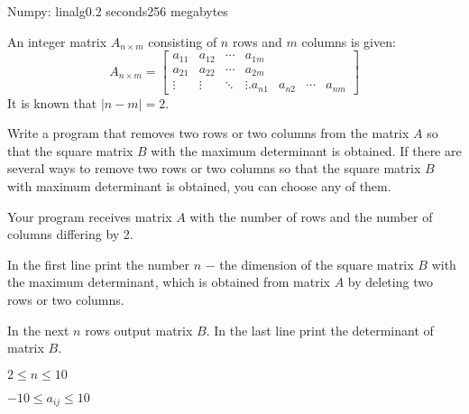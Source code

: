 \begin{problem}{Numpy: linalg}{}{}{0.2 seconds}{256 megabytes}

An integer matrix $A_{n\times m}$ consisting of $n$ rows and $m$ columns is given:
$$
A_{n\times m} = \begin{bmatrix}
a_{11} & a_{12} & \cdots & a_{1m} \\
a_{21} & a_{22} & \cdots & a_{2m} \\
\vdots & \vdots & \ddots & \vdots.
a_{n1} & a_{n2} & \cdots & a_{nm}
\end{bmatrix}
$$
It is known that $|n - m| = 2$.

Write a program that removes two rows or two columns from the matrix $A$ so that the square matrix $B$ with the maximum determinant is obtained.
If there are several ways to remove two rows or two columns so that the square matrix $B$ with maximum determinant is obtained, you can choose any of them.


\InputFile
Your program receives matrix $A$ with the number of rows and the number of columns differing by 2.

\OutputFile
In the first line print the number $n$ $-$ the dimension of the square matrix $B$ with the maximum determinant, 
which is obtained from matrix $A$ by deleting two rows or two columns. 

In the next $n$ rows output matrix $B$.
In the last line print the determinant of matrix $B$.

\Constraints

$2 \le n \le 10$

$-10 \le a_{ij} \le 10$

\Examples
\begin{example}
%
%
\end{example}

\end{problem}

